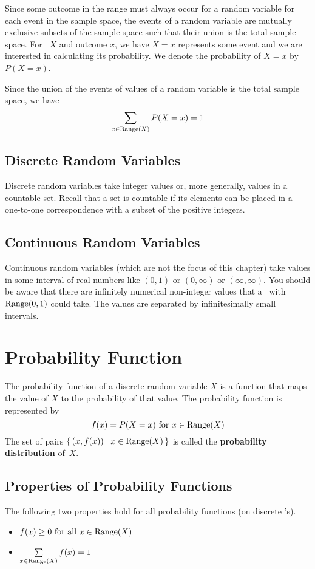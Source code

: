 Since some outcome in the range must always occur for a random variable for each event in the sample space, the events of a random variable are mutually exclusive subsets of the sample space such that their union is the total sample space. For \rv~$X$ and outcome $x$, we have $X = x$ represents some event and we are interested in calculating its probability. We denote the probability of $X = x$ by $P(X = x)$.
\begin{info}
Since the union of the events of values of a random variable is the total sample space, we have
\[
    \sum_{x \in \operatorname{Range}(X)} P(X=x) = 1
\]
\end{info}
\subsection*{Discrete Random Variables}
Discrete random variables take integer values or, more generally, values in a countable set. Recall that a set is countable if its elements can be placed in a one-to-one correspondence with a subset of the positive integers.
\subsection*{Continuous Random Variables}
Continuous random variables (which are not the focus of this chapter) take values in some interval of real numbers like $(0,1)$ or $(0,\infty)$ or $(\infty,\infty)$. You should be aware that there are infinitely numerical non-integer values that a \rv~with $\operatorname{Range}(0,1)$ could take. The values are separated by infinitesimally small intervals.
\section{Probability Function}
The probability function of a discrete random variable $X$ is a function that maps the value of $X$ to the probability of that value. The probability function is represented by 
\[
    f(x) = P(X = x)\text{ for } x\in\operatorname{Range}(X)
\]
The set of pairs $\{\, (x,f(x)) \mid x\in\operatorname{Range}(X) \,\}$ is called the \textbf{probability distribution} of~$X$.

\subsection*{Properties of Probability Functions}
The following two properties hold for all probability functions (on discrete \rv's).
\begin{itemize}
    \item $f(x) \geq 0 \text{ for }\text{all } x\in\operatorname{Range}(X)$
    \item $\sum\limits_{x\in\operatorname{Range}(X)} f(x) = 1$
\end{itemize}

